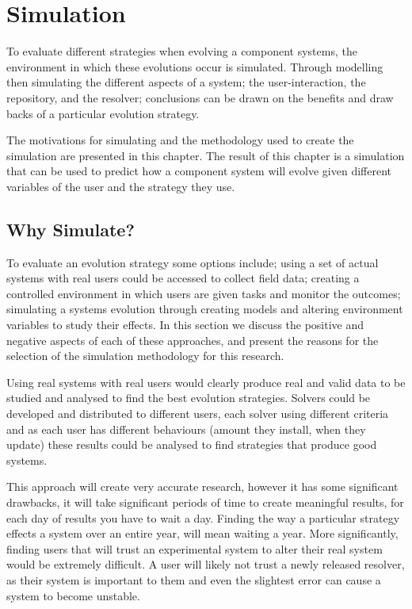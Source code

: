 \chapter{Simulation}
\label{simulation}
{}To evaluate different strategies when evolving a component systems, the environment in which these evolutions occur is simulated.
{}Through modelling then simulating the different aspects of a system; the user-interaction, the repository, and the resolver;
{}conclusions can be drawn on the benefits and draw backs of a particular evolution strategy.

{}The motivations for simulating and the methodology used to create the simulation are presented in this chapter.
{}The result of this chapter is a simulation that can be used to predict how a component system will evolve given different variables of the user and the strategy they use.

\section{Why Simulate?}
To evaluate an evolution strategy some options include;
using a set of actual systems with real users could be accessed to collect field data;
creating a controlled environment in which users are given tasks and monitor the outcomes;
simulating a systems evolution through creating models and altering environment variables to study their effects.
In this section we discuss the positive and negative aspects of each of these approaches,
and present the reasons for the selection of the simulation methodology for this research.

Using real systems with real users would clearly produce real and valid data to be studied and analysed to find the best evolution strategies.
Solvers could be developed and distributed to different users, each solver using different criteria 
and as each user has different behaviours (amount they install, when they update)
these results could be analysed to find strategies that produce good systems. 

This approach will create very accurate research, however it has some significant drawbacks,
it will take significant periods of time to create meaningful results, for each day of results you have to wait a day.
Finding the way a particular strategy effects a system over an entire year, will mean waiting a year.
More significantly, finding users that will trust an experimental system to alter their real system would be extremely difficult.   
A user will likely not trust a newly released resolver, as their system is important to them and even the slightest error can cause
a system to become unstable.

